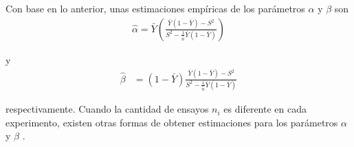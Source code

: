 \documentclass[10pt,openright]{book}\usepackage[]{graphicx}\usepackage[]{color}
\begin{document}
Con base en lo anterior, unas estimaciones emp\'iricas de los par\'ametros $\alpha$ y $\beta$ son
\begin{align}
\hat{\alpha}=\bar{Y}\left(\frac{\bar{Y}\left(1-\bar{Y}\right)
-S^2}{S^2-\frac{1}{\hat{n}}\bar{Y}\left(1-\bar{Y}\right)}\right)
\end{align}

y
\begin{align}
\hat{\beta}&=(1-\bar{Y})\frac{\bar{Y}\left(1-\bar{Y}\right)-S^2}{S^2-\frac{1}{\hat{n}}\bar{Y}\left(1-\bar{Y}\right)}
\end{align}

respectivamente. Cuando la cantidad de ensayos $n_i$ es diferente en cada experimento, existen otras formas de obtener estimaciones para los par\'ametros $\alpha$ y $\beta$ \cite[p. 81]{Carlin96}.
\end{document}
